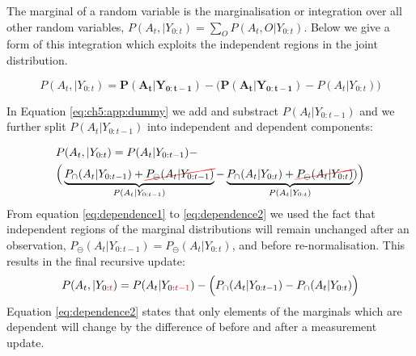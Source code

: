 The marginal of a random variable is the marginalisation or integration over all other random variables, $P(A_t,|Y_{0:t}) = \sum\limits_{O} P(A_t,O|Y_{0:t})$. Below 
we give a form of this integration which exploits the independent regions in the joint distribution.

\begin{equation} \label{eq:ch5:app:dummy}
 P(A_t,|Y_{0:t}) = \mathbf{P(A_t|Y_{0:t-1})} - \Big(\mathbf{P(A_t|Y_{0:t-1})} - P(A_t|Y_{0:t}) \Big) 
\end{equation}

In Equation \ref{eq:ch5:app:dummy} we add and substract $P(A_t|Y_{0:t-1})$ and we further split 
$P(A_t|Y_{0:t-1})$ into independent and dependent components: 

\begin{align}
  &P(A_t,|Y_{0:t}) =  P(A_t|Y_{0:t-1}) - \nonumber \\ 
  &\Big(\underbrace{P_{\cap}(A_t|Y_{0:t-1}) + \Ccancel[red]{P_{\ominus}(A_t|Y_{0:t-1})}}_{P(A_t|Y_{0:t-1})} -  \underbrace{P_{\cap}(A_t|Y_{0:t}) + \Ccancel[red]{P_{\ominus}(A_t|Y_{0:t})}}_{P(A_t|Y_{0:t})})   \Big) \label{eq:dependence1} 
\end{align}
From equation \ref{eq:dependence1} to \ref{eq:dependence2} we used the fact that independent regions of the marginal distributions will remain unchanged after
an observation, $P_{\ominus}(A_t|Y_{0:t-1}) = P_{\ominus}(A_t|Y_{0:t})$, and before re-normalisation. This results in the final recursive update:
\begin{equation}
 P(A_t,|Y_{0:\color{red}{t}}) =  P(A_t|Y_{0:\color{red}{t-1}}) - \Big(P_{\cap}(A_t|Y_{0:t-1}) -  P_{\cap}(A_t|Y_{0:t})  \Big) \label{eq:dependence2} 
\end{equation}
Equation \ref{eq:dependence2} states that only elements of the marginals which are dependent will change by the difference of before and after 
a measurement update.


